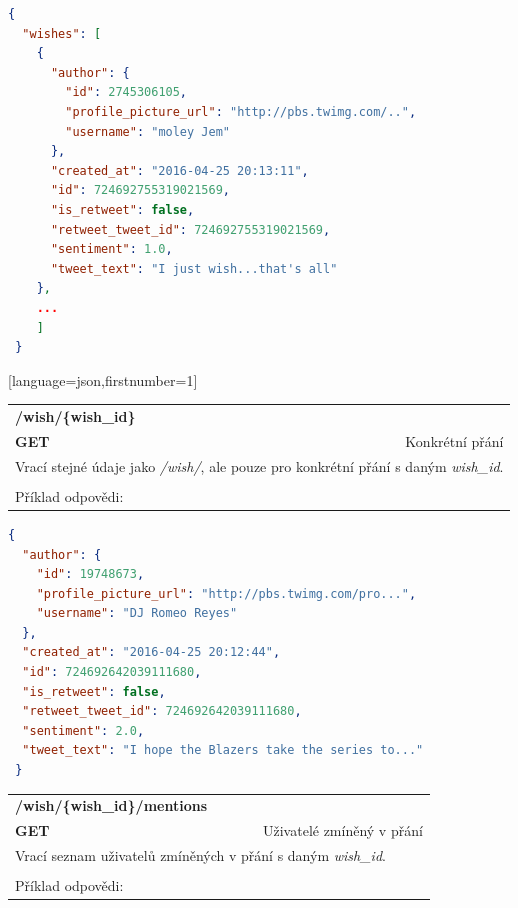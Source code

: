 \documentclass[thesis=B,czech]{FITthesis}[2012/06/26]
\begin{document}
\begin{lstlisting}[language=json,firstnumber=1]
 {
  "wishes": [
    {
      "author": {
        "id": 2745306105,
        "profile_picture_url": "http://pbs.twimg.com/..",
        "username": "moley Jem"
      },
      "created_at": "2016-04-25 20:13:11",
      "id": 724692755319021569,
      "is_retweet": false,
      "retweet_tweet_id": 724692755319021569,
      "sentiment": 1.0,
      "tweet_text": "I just wish...that's all"
    },
    ...
    ]
 }
\end{lstlisting}[language=json,firstnumber=1]


\begin{table}[h]
\begin{tabular}{llllr}
\rowcolor[HTML]{EFEFEF}
\large \textbf{/wish/\{wish\_id\}}        &         &                 &        & \multicolumn{1}{l}{}                \\
\rowcolor[HTML]{EFEFEF}
\textbf{GET}          &         &                 &        & Konkrétní přání                        \\
\multicolumn{5}{l}{\parbox[t]{12.8cm}{Vrací stejné údaje jako \textit{/wish/}, ale pouze pro konkrétní přání s daným \textit{wish\_id}.}  } \\  
 & & & & \\
 Příklad odpovědi:
\end{tabular}
\end{table}
 
\begin{lstlisting}[language=json,firstnumber=1]
{
  "author": {
    "id": 19748673,
    "profile_picture_url": "http://pbs.twimg.com/pro...",
    "username": "DJ Romeo Reyes"
  },
  "created_at": "2016-04-25 20:12:44",
  "id": 724692642039111680,
  "is_retweet": false,
  "retweet_tweet_id": 724692642039111680,
  "sentiment": 2.0,
  "tweet_text": "I hope the Blazers take the series to..."
 }
\end{lstlisting} 

\begin{table}[h]
\begin{tabular}{llllr}
\rowcolor[HTML]{EFEFEF}
\large \textbf{/wish/\{wish\_id\}/mentions}        &         &                 &        & \multicolumn{1}{l}{}                \\
\rowcolor[HTML]{EFEFEF}
\textbf{GET}          &         &                 &        & Uživatelé zmíněný v přání                        \\
\multicolumn{5}{l}{\parbox[t]{12.8cm}{Vrací seznam uživatelů zmíněných v přání s daným \textit{wish\_id}.}  } \\    
 & & & & \\
 Příklad odpovědi:
\end{tabular}
\end{table}
\end{document}
